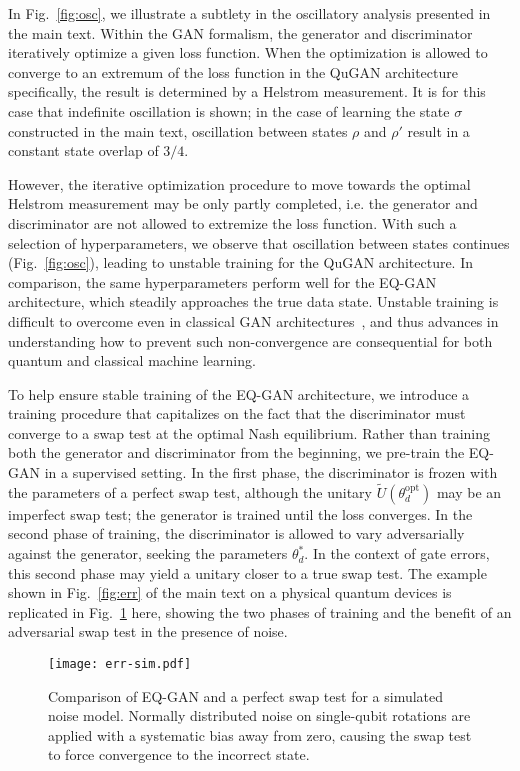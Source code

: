 \documentclass[prl,superscriptaddress,twocolumn]{revtex4}
\theoremstyle{plain}
\theoremstyle{definition}
\begin{document}
In Fig.~\ref{fig:osc}, we illustrate a subtlety in the oscillatory analysis presented in the main text. Within the GAN formalism, the generator and discriminator iteratively optimize a given loss function. When the optimization is allowed to converge to an extremum of the loss function in the QuGAN architecture specifically, the result is determined by a Helstrom measurement. It is for this case that indefinite oscillation is shown; in the case of learning the state $\sigma$ constructed in the main text, oscillation between states $\rho$ and $\rho'$ result in a constant state overlap of $3/4$.

However, the iterative optimization procedure to move towards the optimal Helstrom measurement may be only partly completed, i.e. the generator and discriminator are not allowed to extremize the loss function. With such a selection of hyperparameters, we observe that oscillation between states continues (Fig.~\ref{fig:osc}), leading to unstable training for the QuGAN architecture. In comparison, the same hyperparameters perform well for the EQ-GAN architecture, which steadily approaches the true data state. Unstable training is difficult to overcome even in classical GAN architectures~\cite{pmlr-v80-mescheder18a}, and thus advances in understanding how to prevent such non-convergence are consequential for both quantum and classical machine learning.

To help ensure stable training of the EQ-GAN architecture, we introduce a training procedure that capitalizes on the fact that the discriminator must converge to a swap test at the optimal Nash equilibrium. Rather than training both the generator and discriminator from the beginning, we pre-train the EQ-GAN in a supervised setting. In the first phase, the discriminator is frozen with the parameters of a perfect swap test, although the unitary $\tilde U(\theta_d^\mathrm{opt})$ may be an imperfect swap test; the generator is trained until the loss converges. In the second phase of training, the discriminator is allowed to vary adversarially against the generator, seeking the parameters $\theta_d^*$. In the context of gate errors, this second phase may yield a unitary closer to a true swap test. The example shown in Fig.~\ref{fig:err} of the main text on a physical quantum devices is replicated in Fig.~\ref{fig:errsim} here, showing the two phases of training and the benefit of an adversarial swap test in the presence of noise.

\begin{figure}[h!]
\begin{center}
\texttt{[image: err-sim.pdf]}
\caption{Comparison of EQ-GAN and a perfect swap test for a simulated noise model. Normally distributed noise on single-qubit rotations are applied with a systematic bias away from zero, causing the swap test to force convergence to the incorrect state.}
\label{fig:errsim}
\end{center}
\end{figure}
\end{document}
